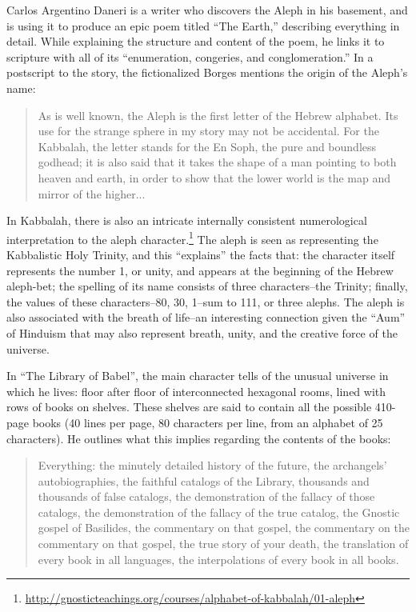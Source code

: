 \documentclass{thesis}
\begin{document}
	Carlos Argentino Daneri is a writer who discovers the Aleph in his basement, and is using it to produce an epic poem titled ``The Earth,'' describing everything in detail. While explaining the structure and content of the poem, he links it to scripture with all of its ``enumeration, congeries, and conglomeration.'' In a postscript to the story, the fictionalized Borges mentions the origin of the Aleph's name:
	
	\begin{quote}
	As is well known, the Aleph is the first letter of the Hebrew alphabet. Its use for the strange sphere in my story may not be accidental. For the Kabbalah, the letter stands for the En Soph, the pure and boundless godhead; it is also said that it takes the shape of a man pointing to both heaven and earth, in order to show that the lower world is the map and mirror of the higher...
	\end{quote}
	
	In Kabbalah, there is also an intricate internally consistent numerological interpretation to the aleph character.\footnote{\url{http://gnosticteachings.org/courses/alphabet-of-kabbalah/01-aleph}} The aleph is seen as representing the Kabbalistic Holy Trinity, and this ``explains'' the facts that: the character itself represents the number 1, or unity, and appears at the beginning of the Hebrew aleph-bet; the spelling of its name consists of three characters--the Trinity; finally, the values of these characters--80, 30, 1--sum to 111, or three alephs. The aleph is also associated with the breath of life--an interesting connection given the ``Aum'' of Hinduism that may also represent breath, unity, and the creative force of the universe.
	
	In ``The Library of Babel'', the main character tells of the unusual universe in which he lives: floor after floor of interconnected hexagonal rooms, lined with rows of books on shelves. These shelves are said to contain all the possible 410-page books (40 lines per page, 80 characters per line, from an alphabet of 25 characters). He outlines what this implies regarding the contents of the books:
	
	\begin{quote}
	Everything: the minutely detailed history of the future, the archangels' autobiographies, the faithful catalogs of the Library, thousands and thousands of false catalogs, the demonstration of the fallacy of those catalogs, the demonstration of the fallacy of the true catalog, the Gnostic gospel of Basilides, the commentary on that gospel, the commentary on the commentary on that gospel, the true story of your death, the translation of every book in all languages, the interpolations of every book in all books. 
	\end{quote}
	
\end{document}
